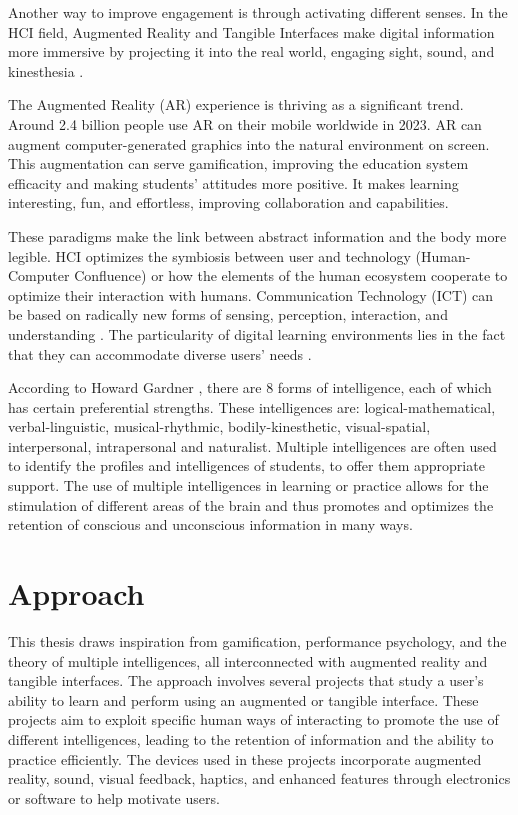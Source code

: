 Another way to improve engagement is through activating different senses. In the HCI field, Augmented Reality and Tangible Interfaces make digital information more immersive by projecting it into the real world, engaging sight, sound, and kinesthesia \cite{seichter2007augmented}.

The Augmented Reality (AR) experience is thriving as a significant trend. Around 2.4 billion people use AR on their mobile worldwide in 2023. AR can augment computer-generated graphics into the natural environment on screen. This augmentation can serve gamification, improving the education system efficacity and making students' attitudes more positive. It makes learning interesting, fun, and effortless, improving collaboration and capabilities.

These paradigms make the link between abstract information and the body more legible.
HCI optimizes the symbiosis between user and technology (Human-Computer Confluence) or how the elements of the human ecosystem cooperate to optimize their interaction with humans. Communication Technology (ICT) can be based on radically new forms of sensing, perception, interaction, and understanding \cite{ferscha2007human}. The particularity of digital learning environments lies in the fact that they can accommodate diverse users' needs \cite{stephanidis2019seven}.

According to Howard Gardner \cite{gardner2004intelligences}, there are 8 forms of intelligence, each of which has certain preferential strengths. These intelligences are: logical-mathematical, verbal-linguistic, musical-rhythmic, bodily-kinesthetic, visual-spatial, interpersonal, intrapersonal and naturalist. Multiple intelligences are often used to identify the profiles and intelligences of students, to offer them appropriate support. The use of multiple intelligences in learning or practice allows for the stimulation of different areas of the brain and thus promotes and optimizes the retention of conscious and unconscious information in many ways.

\section{Approach}

This thesis draws inspiration from gamification, performance psychology, and the theory of multiple intelligences, all interconnected with augmented reality and tangible interfaces.
The approach involves several projects that study a user's ability to learn and perform using an augmented or tangible interface. 
These projects aim to exploit specific human ways of interacting to promote the use of different intelligences, leading to the retention of information and the ability to practice efficiently. 
The devices used in these projects incorporate augmented reality, sound, visual feedback, haptics, and enhanced features through electronics or software to help motivate users. 

